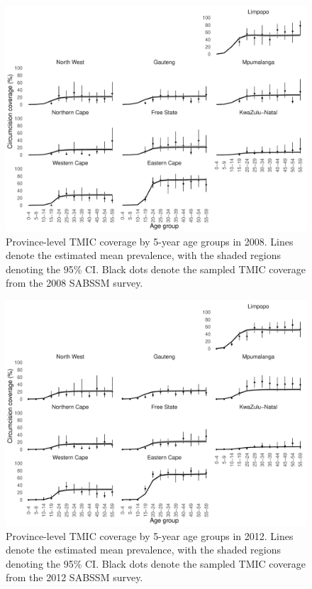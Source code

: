 \documentclass{article}
\begin{document}
\begin{appendix}

\begin{figure}[H]
	\centering
	\includegraphics[width = \linewidth]{Figures/suppmat/ModelFit/TMICPrev_5year_Province_2008_withsurveypoints}
	\caption{Province-level TMIC coverage by 5-year age groups in 2008. Lines denote the estimated mean prevalence, with the shaded regions denoting the 95\% CI. Black dots denote the sampled TMIC coverage from the 2008 SABSSM survey.}
\end{figure}


\begin{figure}[H]
	\centering
	\includegraphics[width = \linewidth]{Figures/suppmat/ModelFit/TMICPrev_5year_Province_2012_withsurveypoints}
	\caption{Province-level TMIC coverage by 5-year age groups in 2012. Lines denote the estimated mean prevalence, with the shaded regions denoting the 95\% CI. Black dots denote the sampled TMIC coverage from the 2012 SABSSM survey.}
\end{figure}


\end{appendix}
\end{document}
